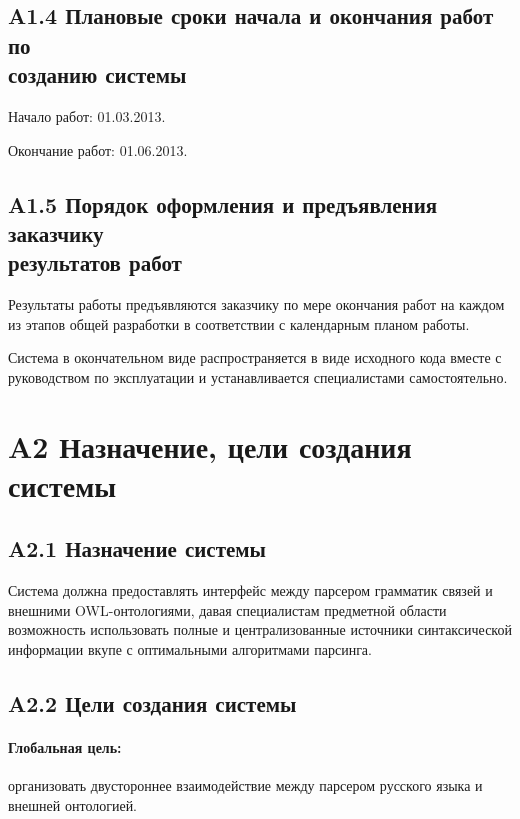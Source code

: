 \subsection*{A1.4 Плановые сроки начала и окончания работ по\\ созданию системы}
Начало работ: 01.03.2013.

Окончание работ: 01.06.2013.

\subsection*{A1.5 Порядок оформления и предъявления заказчику\\ результатов работ}
Результаты работы предъявляются заказчику по мере окончания работ на каждом из этапов общей разработки
в соответствии с календарным планом работы.

Система в окончательном виде распространяется в виде исходного кода вместе с руководством по эксплуатации и устанавливается специалистами самостоятельно.

\section*{A2 Назначение, цели создания системы}
\subsection*{A2.1 Назначение системы}
Система должна предоставлять интерфейс между парсером грамматик связей и внешними OWL-онтологиями, давая специалистам предметной области возможность использовать полные и централизованные источники синтаксической информации вкупе с оптимальными алгоритмами парсинга.

\subsection*{A2.2 Цели создания системы}
\paragraph{Глобальная цель:} организовать двустороннее взаимодействие между парсером русского языка и внешней онтологией.
